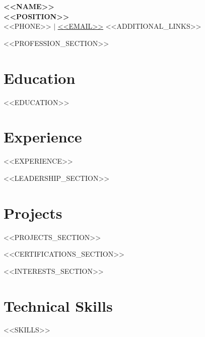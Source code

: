 \documentclass[11pt,a4paper]{article}
\newcommand{\resumeSubHeadingListStart}{\begin{itemize}[leftmargin=0.15in, label={}]}
\newcommand{\resumeSubHeadingListEnd}{\end{itemize}}
\begin{document}
\begin{center}
    \textbf{\Huge \scshape <<NAME>>} \\ \vspace{1pt}
    \textbf{\large \scshape <<POSITION>>} \\ \vspace{1pt}
    \small <<PHONE>> $|$ \href{mailto:<<EMAIL>>}{\underline{<<EMAIL>>}}
    <<ADDITIONAL_LINKS>>
\end{center}

<<PROFESSION_SECTION>>

\section{Education}
  \resumeSubHeadingListStart
    <<EDUCATION>>
  \resumeSubHeadingListEnd

\section{Experience}
  \resumeSubHeadingListStart
    <<EXPERIENCE>>
  \resumeSubHeadingListEnd

<<LEADERSHIP_SECTION>>

\section{Projects}
\resumeSubHeadingListStart
<<PROJECTS_SECTION>>
\resumeSubHeadingListEnd

<<CERTIFICATIONS_SECTION>>

<<INTERESTS_SECTION>>

\section{Technical Skills}
 \begin{itemize}[leftmargin=0.15in, label={}]
    \small{\item{
     <<SKILLS>>
    }}
 \end{itemize}

\end{document}
